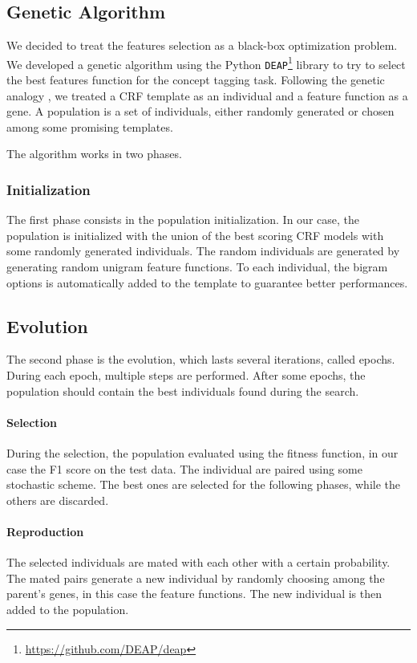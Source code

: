\subsection{Genetic Algorithm}
\label{subsection:genetic}
We decided to treat the features selection as a black-box optimization problem.
We developed a genetic algorithm using the Python \texttt{DEAP}\footnote{\url{https://github.com/DEAP/deap}} library \cite{deap} to try to select the best features function for the concept tagging task.
Following the genetic analogy \cite{lion}, we treated a \ac{CRF} template as an individual and a feature function as a gene.
A population is a set of individuals, either randomly generated or chosen among some promising templates.

The algorithm works in two phases.

\subsubsection{Initialization}
The first phase consists in the population initialization.
In our case, the population is initialized with the union of the best scoring \ac{CRF} models with some randomly generated individuals.
The random individuals are generated by generating random unigram feature functions.
To each individual, the bigram options is automatically added to the template to guarantee better performances.

\subsection{Evolution}
The second phase is the evolution, which lasts several iterations, called epochs.
During each epoch, multiple steps are performed.
After some epochs, the population should contain the best individuals found during the search.

\paragraph{Selection}
During the selection, the population evaluated using the fitness function, in our case the F1 score on the test data.
The individual are paired using some stochastic scheme.
The best ones are selected for the following phases, while the others are discarded.

\paragraph{Reproduction}
The selected individuals are mated with each other with a certain probability.
The mated pairs generate a new individual by randomly choosing among the parent's genes, in this case the feature functions.
The new individual is then added to the population.

